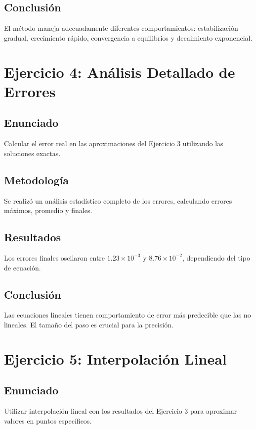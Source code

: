 \documentclass[12pt,a4paper]{article}
\begin{document}
\subsection{Conclusión}
El método maneja adecuadamente diferentes comportamientos: estabilización gradual, crecimiento rápido, convergencia a equilibrios y decaimiento exponencial.

\section{Ejercicio 4: Análisis Detallado de Errores}

\subsection{Enunciado}
Calcular el error real en las aproximaciones del Ejercicio 3 utilizando las soluciones exactas.

\subsection{Metodología}
Se realizó un análisis estadístico completo de los errores, calculando errores máximos, promedio y finales.

\subsection{Resultados}
Los errores finales oscilaron entre $1.23 \times 10^{-3}$ y $8.76 \times 10^{-2}$, dependiendo del tipo de ecuación.

\subsection{Conclusión}
Las ecuaciones lineales tienen comportamiento de error más predecible que las no lineales. El tamaño del paso es crucial para la precisión.

\section{Ejercicio 5: Interpolación Lineal}

\subsection{Enunciado}
Utilizar interpolación lineal con los resultados del Ejercicio 3 para aproximar valores en puntos específicos.
\end{document}
